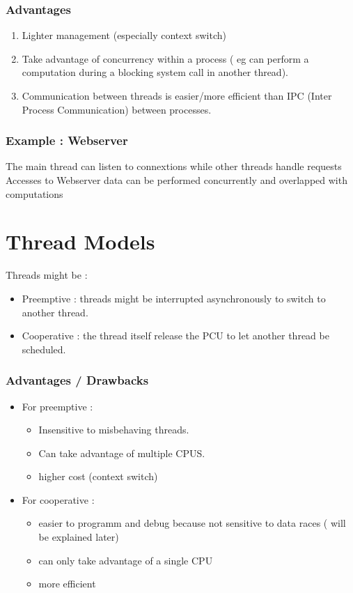 \documentclass[a4paper,10pt]{article}
\begin{document}
\subsubsection*{Advantages}
\begin{enumerate}[label=-]
	\item Lighter management (especially context switch)
	\item Take advantage of concurrency within a process ( eg can perform a computation during a blocking system call in another thread).
	\item Communication between threads is easier/more efficient than IPC (Inter Process Communication) between processes.
\end{enumerate}

\subsubsection*{Example : Webserver}
The main thread can listen to connextions while other threads handle requests
Accesses to Webserver data can be performed concurrently and overlapped with computations

\section{Thread Models}

Threads might be :
\begin{itemize}
\item Preemptive : threads might be interrupted asynchronously to switch to another thread. 
\item Cooperative : the thread itself release the PCU to let another thread be scheduled.
\end{itemize}

\subsubsection*{Advantages / Drawbacks}

\begin{itemize}
 \item For preemptive :
\begin{itemize} 
\item Insensitive to misbehaving threads.
\item Can take advantage of multiple CPUS.
\item higher cost (context switch) 
\end{itemize}

\item For cooperative :
 \begin{itemize}
 
\item easier to programm and debug  because not sensitive to data races ( will be explained later) 
\item can only take advantage of a single CPU 
\item more efficient
\end{itemize}
\end{itemize}
\end{document}
